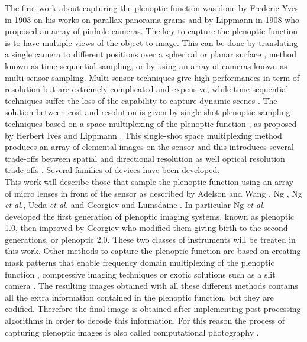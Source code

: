  The first work about capturing the plenoptic function was done by Frederic Yves in 1903 \cite{ives1903parallax} on his works on parallax panorama-grams and by Lippmann in 1908 \cite{gabriel1908photographie} who proposed an array of pinhole cameras. The key to capture the plenoptic function is to have multiple views of the object to image. This can be done by translating a single camera to different positions over a spherical or planar surface \cite{levoy1996light,taguchi2010axial,gortler1996lumigraph}, method known as time sequential sampling, or by using an array of cameras \cite{wilburn2001light,yang2002real,nomura2007scene} known as multi-sensor sampling. Multi-sensor techniques give high performances in term of resolution but are extremely complicated and expensive, while time-sequential techniques suffer the loss of the capability to capture dynamic scenes \cite{wetzstein2011computational}. The solution between cost and resolution is given by single-shot plenoptic sampling techniques based on a space multiplexing of the plenoptic function \cite{wetzstein2011computational}, as proposed by Herbert Ives \cite{ives1930parallax} and Lippmann \cite{gabriel1908photographie}. This single-shot space multiplexing method produces an array of elemental images on the sensor and this introduces several trade-offs between spatial and directional resolution \cite{wetzstein2011computational,georgiev2006spatio} as well optical resolution trade-offs \cite{turola2014wave}. Several families of devices have been developed.\\ This work will describe those that sample the plenoptic function using an array of micro lenses in front of the sensor as described by Adelson and Wang \cite{adelson1992single}, Ng \cite{ng2005light}, Ng \textit{et al.}\cite{ng2006digital}, Ueda \textit{et al.} \cite{ueda2008adaptive} and Georgiev and Lumsdaine \cite{georgiev2010focused}. In particular Ng \textit{et al.} developed the first generation of plenoptic imaging systems, known as plenoptic 1.0, then improved by Georgiev who modified them giving birth to the second generations, or plenoptic 2.0. These two classes of instruments will be treated in this work. Other methods to capture the plenoptic function are based on creating mask patterns that enable frequency domain multiplexing of the plenoptic function \cite{veeraraghavan2007dappled,lanman2008shield}, compressive imaging techniques \cite{marwah2013compressive} or exotic solutions such as a slit camera \cite{ji2015depth}. The resulting images obtained with all these different methods contains all the extra information contained in the plenoptic function, but they are codified. Therefore the final image is obtained after implementing post processing algorithms in order to decode this information. For this reason the process of capturing plenoptic images is also called computational photography \cite{wetzstein2011computational,nayar2006computational}.\\ 
